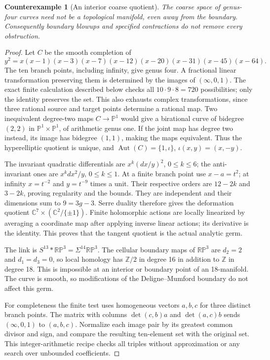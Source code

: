 \documentclass[11pt,a4paper]{article}
\newtheorem{counterexample}[theorem]{Counterexample}
\theoremstyle{definition}
\newcommand{\C}{\mathbb C}
\newcommand{\Z}{\mathbb Z}
\begin{document}
\begin{counterexample}[An interior coarse quotient]\label{ex:moduli}
The coarse space of genus-four curves need not be a topological
manifold, even away from the boundary. Consequently boundary blowups
and specified contractions do not remove every obstruction.
\end{counterexample}
\begin{proof}
Let $C$ be the smooth completion of
\[
 y^2=x(x-1)(x-3)(x-7)(x-12)(x-20)(x-31)(x-45)(x-64).
\]
The ten branch points, including infinity, give genus four.
A fractional linear transformation preserving them is determined by
the images of $(\infty,0,1)$. The exact finite calculation described
below checks all $10\cdot9\cdot8=720$ possibilities; only the identity
preserves the set. This also exhausts complex transformations, since
three rational source and target points determine a rational map.
Two inequivalent degree-two maps $C\to\mathbb P^1$ would give a
birational curve of bidegree $(2,2)$ in
$\mathbb P^1\times\mathbb P^1$, of arithmetic genus one. If the joint
map has degree two instead, its image has bidegree $(1,1)$, making the
maps equivalent. Thus the hyperelliptic quotient is unique, and
$\operatorname{Aut}(C)=\{1,\iota\}$, $\iota(x,y)=(x,-y)$.

The invariant quadratic differentials are
$x^k(dx/y)^2$, $0\le k\le6$; the anti-invariant ones are
$x^k dx^2/y$, $0\le k\le1$. At a finite branch point use
$x-a=t^2$; at infinity $x=t^{-2}$ and $y=t^{-9}$ times a unit.
Their respective orders are $12-2k$ and $3-2k$, proving regularity and
the bounds. They are independent and their dimensions sum to
$9=3g-3$. Serre duality therefore gives the deformation quotient
$\C^7\times(\C^2/\{\pm1\})$. Finite holomorphic actions are locally
linearized by averaging a coordinate map after applying inverse linear
actions; its derivative is the identity. This proves that the tangent
quotient is the actual analytic germ.

The link is $S^{13}*\mathbb{RP}^3=\Sigma^{14}\mathbb{RP}^3$.
The cellular boundary maps of $\mathbb{RP}^3$ are $d_2=2$ and
$d_1=d_3=0$, so local homology has $\Z/2$ in degree 16 in addition
to $\Z$ in degree 18. This is impossible at an interior or boundary
point of an 18-manifold. The curve is smooth, so modifications of the
Deligne--Mumford boundary do not affect this germ.

For completeness the finite test uses homogeneous vectors $a,b,c$ for
three distinct branch points. The matrix with columns
$\det(c,b)a$ and $\det(a,c)b$ sends $(\infty,0,1)$ to $(a,b,c)$.
Normalize each image pair by its greatest common divisor and sign, and
compare the resulting ten-element set with the original set. This
integer-arithmetic recipe checks all triples without approximation or
any search over unbounded coefficients.
\end{proof}
\end{document}
